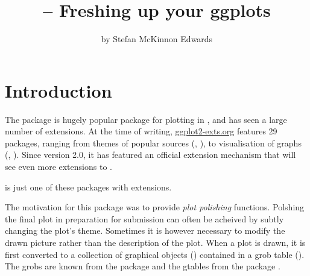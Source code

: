 \title{ -- Freshing up your ggplots}
\author{by Stefan McKinnon Edwards}

\maketitle


\section{Introduction}

The  package \citep{ggplot2009,ggplot2016} is hugely
popular package for plotting in \R, and has seen a large number of
extensions. At the time of writing, \url{ggplot2-exts.org} features 29
packages, ranging from themes of popular sources (,
\citealt{ggthemes}), to visualisation of graphs (,
\citealt{ggraph}). Since version 2.0, it has featured an official
extension mechanism \citep{ggproto} that will see even more extensions
to .

 is just one of these packages with extensions.

The motivation for this package was to provide \emph{plot polishing}
functions. Polshing the final plot in preparation for submission can
often be acheived by subtly changing the plot's theme. Sometimes it is
however necessary to modify the drawn picture rather than the
description of the plot. When a  plot is drawn, it is first
converted to a collection of graphical objects () contained
in a grob table (). The grobs are known from the 
package \citep{Murrell1999,Murrell2005,Murrell2011} and the gtables from
the  package \citep{gtable}.

